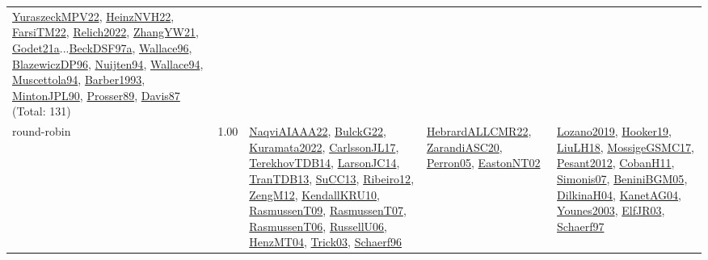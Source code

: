 {\begin{longtable}{p{3cm}r>{\raggedright\arraybackslash}p{6cm}>{\raggedright\arraybackslash}p{6cm}>{\raggedright\arraybackslash}p{8cm}}
\hyperref[detail:YuraszeckMPV22]{YuraszeckMPV22}, \hyperref[detail:HeinzNVH22]{HeinzNVH22}, \hyperref[detail:FarsiTM22]{FarsiTM22}, \hyperref[detail:Relich2022]{Relich2022}, \hyperref[detail:ZhangYW21]{ZhangYW21}, \hyperref[detail:Godet21a]{Godet21a}...\hyperref[detail:BeckDSF97a]{BeckDSF97a}, \hyperref[detail:Wallace96]{Wallace96}, \hyperref[detail:BlazewiczDP96]{BlazewiczDP96}, \hyperref[detail:Nuijten94]{Nuijten94}, \hyperref[detail:Wallace94]{Wallace94}, \hyperref[detail:Muscettola94]{Muscettola94}, \hyperref[detail:Barber1993]{Barber1993}, \hyperref[detail:MintonJPL90]{MintonJPL90}, \hyperref[detail:Prosser89]{Prosser89}, \hyperref[detail:Davis87]{Davis87} (Total: 131)\\
\index{round-robin}\index{ApplicationAreas!round-robin}round-robin &  1.00 & \hyperref[detail:NaqviAIAAA22]{NaqviAIAAA22}, \hyperref[detail:BulckG22]{BulckG22}, \hyperref[detail:Kuramata2022]{Kuramata2022}, \hyperref[detail:CarlssonJL17]{CarlssonJL17}, \hyperref[detail:TerekhovTDB14]{TerekhovTDB14}, \hyperref[detail:LarsonJC14]{LarsonJC14}, \hyperref[detail:TranTDB13]{TranTDB13}, \hyperref[detail:SuCC13]{SuCC13}, \hyperref[detail:Ribeiro12]{Ribeiro12}, \hyperref[detail:ZengM12]{ZengM12}, \hyperref[detail:KendallKRU10]{KendallKRU10}, \hyperref[detail:RasmussenT09]{RasmussenT09}, \hyperref[detail:RasmussenT07]{RasmussenT07}, \hyperref[detail:RasmussenT06]{RasmussenT06}, \hyperref[detail:RussellU06]{RussellU06}, \hyperref[detail:HenzMT04]{HenzMT04}, \hyperref[detail:Trick03]{Trick03}, \hyperref[detail:Schaerf96]{Schaerf96} & \hyperref[detail:HebrardALLCMR22]{HebrardALLCMR22}, \hyperref[detail:ZarandiASC20]{ZarandiASC20}, \hyperref[detail:Perron05]{Perron05}, \hyperref[detail:EastonNT02]{EastonNT02} & \hyperref[detail:Lozano2019]{Lozano2019}, \hyperref[detail:Hooker19]{Hooker19}, \hyperref[detail:LiuLH18]{LiuLH18}, \hyperref[detail:MossigeGSMC17]{MossigeGSMC17}, \hyperref[detail:Pesant2012]{Pesant2012}, \hyperref[detail:CobanH11]{CobanH11}, \hyperref[detail:Simonis07]{Simonis07}, \hyperref[detail:BeniniBGM05]{BeniniBGM05}, \hyperref[detail:DilkinaH04]{DilkinaH04}, \hyperref[detail:KanetAG04]{KanetAG04}, \hyperref[detail:Younes2003]{Younes2003}, \hyperref[detail:ElfJR03]{ElfJR03}, \hyperref[detail:Schaerf97]{Schaerf97}\\

\end{longtable}}
